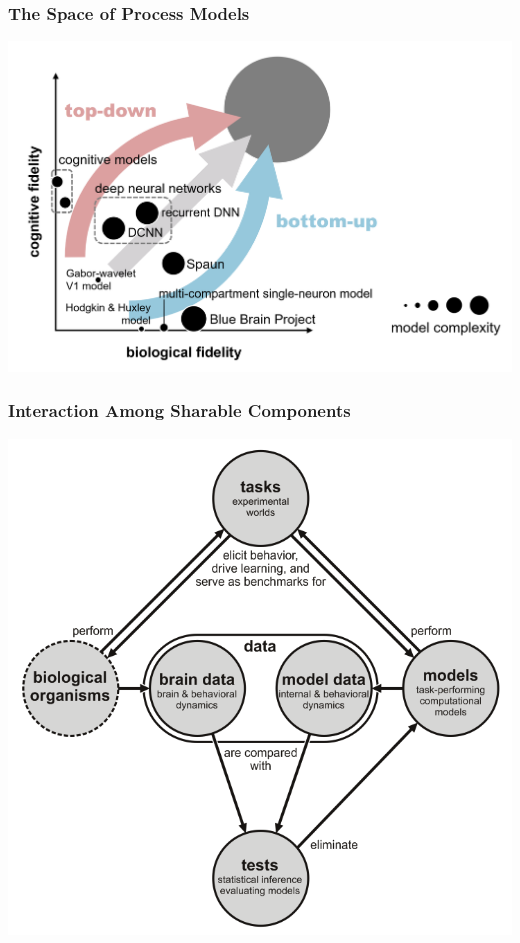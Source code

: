\documentclass[
t, %
10pt, %
aspectratio=1610, %
ngerman,
english,
]{beamer}
\begin{document}
\begin{frame}
    \frametitle{The Space of Process Models}
    \centering
    \includegraphics[height=0.7\textheight]{figures/figure3}
\end{frame}

\begin{frame}
    \frametitle{Interaction Among Sharable Components}
    \centering
    \includegraphics[height=0.7\textheight]{figures/figure4}
\end{frame}
\end{document}
